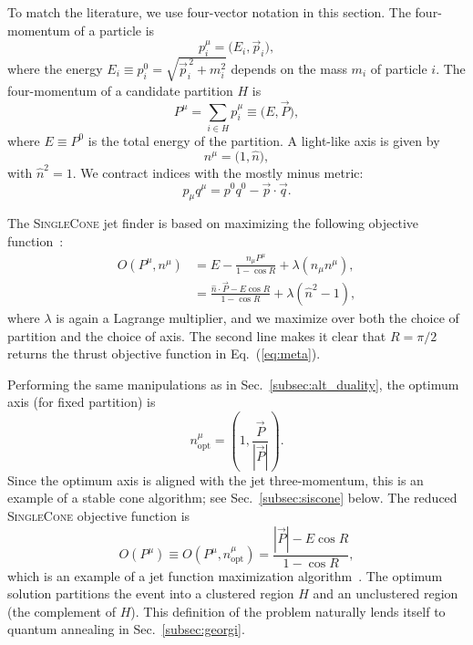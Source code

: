 \documentclass[aps,prd,twocolumn,superscriptaddress,preprintnumbers,nofootinbib,longbibliography,floatfix]{revtex4-1}
\DeclareRobustCommand{\Sec}[1]{Sec.~\ref{#1}}
\DeclareRobustCommand{\Eq}[1]{Eq.~(\ref{#1})}
\newcommand{\opt}{\text{opt}}
\begin{document}
To match the literature, we use four-vector notation in this section.
%
The four-momentum of a particle is
%
\begin{equation}
p^\mu_i = \big(E_i, \vec{p}_i\big),
\end{equation}
%
where the energy $E_i \equiv p_i^0 = \sqrt{\vec{p}_i^{\,2} + m_i^2}$ depends on the mass $m_i$ of particle $i$.
%
The four-momentum of a candidate partition $H$ is
%
\begin{equation}
P^\mu = \sum_{i \in H} p^\mu_i \equiv \big(E, \vec{P}\big),
\end{equation}
%
where $E \equiv P^0$ is the total energy of the partition.
%
A light-like axis is given by
%
\begin{equation}
n^\mu = \big(1,\hat{n} \big),
\end{equation}
with $\hat{n}^2 = 1$.
%
We contract indices with the mostly minus metric:
%
\begin{equation}
p_\mu q^\mu = p^0 q^0 - \vec{p} \cdot \vec{q}.
\end{equation}


The \textsc{SingleCone} jet finder is based on maximizing the following objective function~\cite{Thaler:2015uja}:
%
\begin{align}
\label{eq:meta_R}
O(P^{\mu}, n^{\mu}) &= E - \frac{n_\mu P^\mu}{1 - \cos R}  +\lambda (n_\mu n^\mu),\\
& = \frac{\hat{n} \cdot \vec{P} - E\cos R}{1 - \cos R} +\lambda(\hat{n}^2-1), \nonumber
\end{align}
%
where $\lambda$ is again a Lagrange multiplier, and we maximize over both the choice of partition and the choice of axis.
%
The second line makes it clear that $R = \pi/2$ returns the thrust objective function in \Eq{eq:meta}.


Performing the same manipulations as in \Sec{subsec:alt_duality}, the optimum axis (for fixed partition) is
%
\begin{equation}
\label{eq:stablecone}
n_{\opt}^\mu = \left(1, \frac{\vec{P}}{|\vec{P}|} \right).
\end{equation}
%
Since the optimum axis is aligned with the jet three-momentum, this is an example of a stable cone algorithm; see \Sec{subsec:siscone} below.
%
The reduced \textsc{SingleCone} objective function is
%
\begin{equation}
\label{eq:Georgi}
O(P^{\mu}) \equiv O(P^{\mu}, n_{\opt}^{\mu}) = \frac{|\vec{P}| -E\cos R}{1 - \cos R},
\end{equation}
%
which is an example of a jet function maximization algorithm~\cite{Georgi:2014zwa, Ge:2014ova, Bai:2014qca}.
%
The optimum solution partitions the event into a clustered region $H$ and an unclustered region (the complement of $H$).
%
This definition of the problem naturally lends itself to quantum annealing in \Sec{subsec:georgi}.
\end{document}
